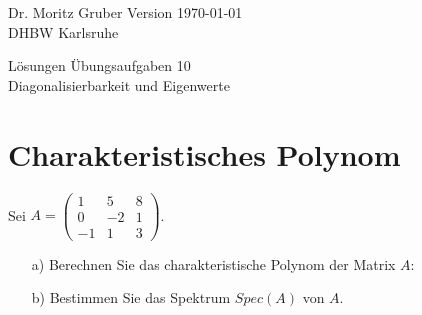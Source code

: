




\vspace*{-20mm}
{
	\color{dhbwGray}
	Dr. Moritz Gruber	\hfill Version \today\\
	DHBW Karlsruhe\\
}

\vspace{10mm}
\begin{center}
	{
		\color{lightBlue}
		{ \LARGE L\"osungen Übungsaufgaben 10}\\[3mm]
		{\Large Diagonalisierbarkeit und Eigenwerte}
	}
\end{center}

\vspace{5mm}



\section{Charakteristisches Polynom}
Sei $A=	\begin{pmatrix}
		1	&5	&8	\\
		0	&-2	&1	\\
		-1	&1	&3
	\end{pmatrix}$. 
\begin{itemize}
\item[a)] Berechnen Sie das charakteristische Polynom der Matrix $A$:
\item[b)] Bestimmen Sie das Spektrum $Spec(A)$ von $A$.
\end{itemize}


